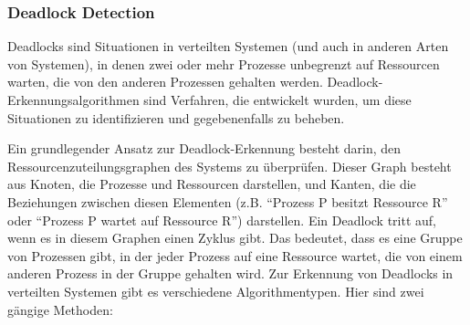 \subsubsection{Deadlock Detection}

Deadlocks sind Situationen in verteilten Systemen (und auch in anderen Arten von Systemen), in denen zwei oder mehr Prozesse unbegrenzt auf Ressourcen warten, die von den anderen Prozessen gehalten werden. Deadlock-Erkennungsalgorithmen sind Verfahren, die entwickelt wurden, um diese Situationen zu identifizieren und gegebenenfalls zu beheben.

Ein grundlegender Ansatz zur Deadlock-Erkennung besteht darin, den Ressourcenzuteilungsgraphen des Systems zu überprüfen. Dieser Graph besteht aus Knoten, die Prozesse und Ressourcen darstellen, und Kanten, die die Beziehungen zwischen diesen Elementen (z.B. \enquote{Prozess P besitzt Ressource R} oder \enquote{Prozess P wartet auf Ressource R}) 
darstellen. Ein Deadlock tritt auf, wenn es in diesem Graphen einen Zyklus gibt. Das bedeutet, dass es eine Gruppe von Prozessen gibt, in der jeder Prozess auf eine Ressource wartet, die von einem anderen Prozess in der Gruppe gehalten wird.
Zur Erkennung von Deadlocks in verteilten Systemen gibt es verschiedene Algorithmentypen. Hier sind zwei gängige Methoden:

